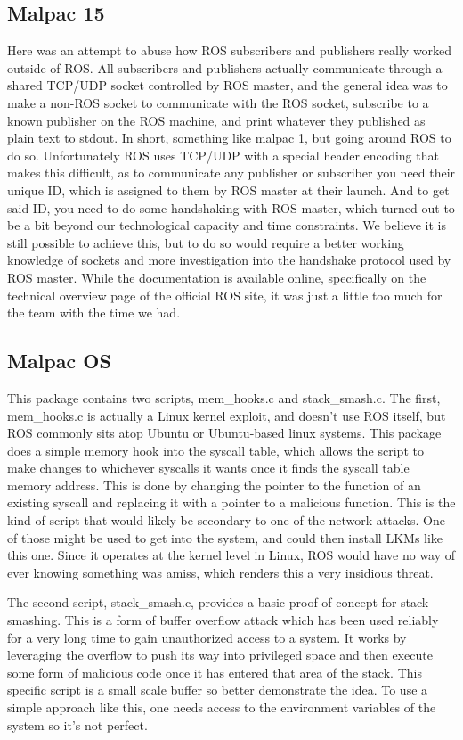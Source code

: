 \documentclass[IEEEtran,letterpaper,10pt,notitlepage,draftclsnofoot,onecolumn]{article}
\begin{document}
\subsection{Malpac 15}
Here was an attempt to abuse how ROS subscribers and publishers really worked outside of ROS. 
All subscribers and publishers actually communicate through a shared TCP/UDP socket controlled by ROS master, and the general idea was to make a non-ROS socket to communicate with the ROS socket, subscribe to a known publisher on the ROS machine, and print whatever they published as plain text to stdout. 
In short, something like malpac 1, but going around ROS to do so. Unfortunately ROS uses TCP/UDP with a special header encoding that makes this difficult, as to communicate any publisher or subscriber you need their unique ID, which is assigned to them by ROS master at their launch. 
And to get said ID, you need to do some handshaking with ROS master, which turned out to be a bit beyond our technological capacity and time constraints. 
We believe it is still possible to achieve this, but to do so would require a better working knowledge of sockets and more investigation into the handshake protocol used by ROS master. 
While the documentation is available online, specifically on the technical overview page of the official ROS site\cite{ROS}, it was just a little too much for the team with the time we had.

\subsection{Malpac OS}
This package contains two scripts, mem_hooks.c and stack_smash.c.
The first, mem_hooks.c is actually a Linux kernel exploit, and doesn't use ROS itself, but ROS commonly sits atop Ubuntu or Ubuntu-based linux systems. 
This package does a simple memory hook into the syscall table, which allows the script to make changes to whichever syscalls it wants once it finds the syscall table memory address. 
This is done by changing the pointer to the function of an existing syscall and replacing it with a pointer to a malicious function.
This is the kind of script that would likely be secondary to one of the network attacks. One of those might be used to get into the system, and could then install LKMs like this one. Since it operates at the kernel level in Linux, ROS would have no way of ever knowing something was amiss, which renders this a very insidious threat.

The second script, stack_smash.c, provides a basic proof of concept for stack smashing. 
This is a form of buffer overflow attack which has been used reliably for a very long time to gain unauthorized access to a system. 
It works by leveraging the overflow to push its way into privileged space and then execute some form of malicious code once it has entered that area of the stack.
This specific script is a small scale buffer so better demonstrate the idea. 
To use a simple approach like this, one needs access to the environment variables of the system so it's not perfect. 
\end{document}
